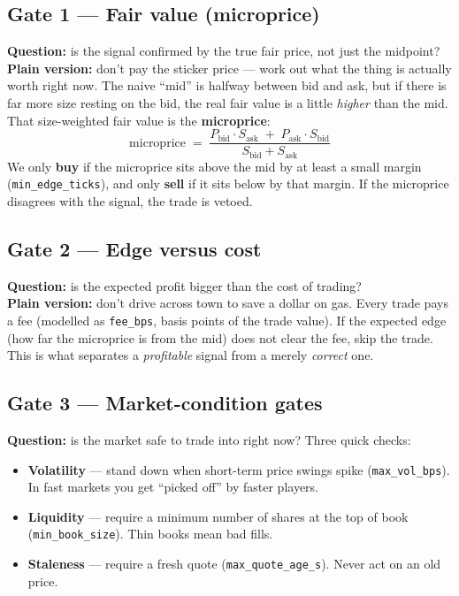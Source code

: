 \documentclass[10pt,a4paper]{article}
\newcommand{\code}[1]{\texttt{\small #1}}
\begin{document}
\subsection{Gate 1 --- Fair value (microprice)}
\textbf{Question:} is the signal confirmed by the true fair price, not just the
midpoint? \\
\textbf{Plain version:} don't pay the sticker price --- work out what the thing is
actually worth right now. The naive ``mid'' is halfway between bid and ask, but if
there is far more size resting on the bid, the real fair value is a little
\emph{higher} than the mid. That size-weighted fair value is the \textbf{microprice}:
\[
  \text{microprice} \;=\; \frac{P_{\text{bid}}\cdot S_{\text{ask}}
    \;+\; P_{\text{ask}}\cdot S_{\text{bid}}}{S_{\text{bid}} + S_{\text{ask}}}
\]
We only \textbf{buy} if the microprice sits above the mid by at least a small margin
(\code{min\_edge\_ticks}), and only \textbf{sell} if it sits below by that margin.
If the microprice disagrees with the signal, the trade is vetoed.

\subsection{Gate 2 --- Edge versus cost}
\textbf{Question:} is the expected profit bigger than the cost of trading? \\
\textbf{Plain version:} don't drive across town to save a dollar on gas. Every trade
pays a fee (modelled as \code{fee\_bps}, basis points of the trade value). If the
expected edge (how far the microprice is from the mid) does not clear the fee, skip
the trade. This is what separates a \emph{profitable} signal from a merely
\emph{correct} one.

\subsection{Gate 3 --- Market-condition gates}
\textbf{Question:} is the market safe to trade into right now? Three quick checks:
\begin{itemize}[leftmargin=1.4em, itemsep=1pt]
  \item \textbf{Volatility} --- stand down when short-term price swings spike
  (\code{max\_vol\_bps}). In fast markets you get ``picked off'' by faster players.
  \item \textbf{Liquidity} --- require a minimum number of shares at the top of book
  (\code{min\_book\_size}). Thin books mean bad fills.
  \item \textbf{Staleness} --- require a fresh quote (\code{max\_quote\_age\_s}).
  Never act on an old price.
\end{itemize}
\end{document}
